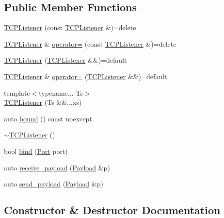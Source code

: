 \subsection*{Public Member Functions}
\begin{DoxyCompactItemize}
\item 
\hyperlink{classnl_1_1Tunnel_1_1TCPListener_a93593c58fcc83eefc031ca7f416c9490}{T\+C\+P\+Listener} (const \hyperlink{classnl_1_1Tunnel_1_1TCPListener}{T\+C\+P\+Listener} \&)=delete
\item 
\hyperlink{classnl_1_1Tunnel_1_1TCPListener}{T\+C\+P\+Listener} \& \hyperlink{classnl_1_1Tunnel_1_1TCPListener_a116f9664351c8409c0a3f86c24b12fc2}{operator=} (const \hyperlink{classnl_1_1Tunnel_1_1TCPListener}{T\+C\+P\+Listener} \&)=delete
\item 
\hyperlink{classnl_1_1Tunnel_1_1TCPListener_ac584ae7b3fd4d64c6d089bd0278957cc}{T\+C\+P\+Listener} (\hyperlink{classnl_1_1Tunnel_1_1TCPListener}{T\+C\+P\+Listener} \&\&)=default
\item 
\hyperlink{classnl_1_1Tunnel_1_1TCPListener}{T\+C\+P\+Listener} \& \hyperlink{classnl_1_1Tunnel_1_1TCPListener_a110e943140627b5e22d237bb4ceee685}{operator=} (\hyperlink{classnl_1_1Tunnel_1_1TCPListener}{T\+C\+P\+Listener} \&\&)=default
\item 
{\footnotesize template$<$typename... Ts$>$ }\\\hyperlink{classnl_1_1Tunnel_1_1TCPListener_a5c1a91c9e6f121def748376b620c9f30}{T\+C\+P\+Listener} (Ts \&\&...xs)
\item 
auto \hyperlink{classnl_1_1Tunnel_1_1TCPListener_a218b5d6841a32264367d6af3fe177df7}{bound} () const  noexcept
\item 
\hyperlink{classnl_1_1Tunnel_1_1TCPListener_acdfa4bf08207b322d79b0cfbd4cdbdb4}{$\sim$\+T\+C\+P\+Listener} ()
\item 
bool \hyperlink{classnl_1_1Tunnel_1_1TCPListener_afa3de0ad1daad4f2615faeb7ef02f678}{bind} (\hyperlink{namespacenl_a12899c87e239db66809da0a71fcc9129}{Port} port)
\item 
auto \hyperlink{classnl_1_1Tunnel_1_1TCPListener_a757c8fa8dcd2e0f3f1eef3ea955ad577}{receive\+\_\+payload} (\hyperlink{structnl_1_1Payload}{Payload} \&p)
\item 
auto \hyperlink{classnl_1_1Tunnel_1_1TCPListener_a0c5b0d9ac10e98538bd3bd6f3d60e6ce}{send\+\_\+payload} (\hyperlink{structnl_1_1Payload}{Payload} \&p)
\end{DoxyCompactItemize}


\subsection{Constructor \& Destructor Documentation}
\hypertarget{classnl_1_1Tunnel_1_1TCPListener_a93593c58fcc83eefc031ca7f416c9490}{}
